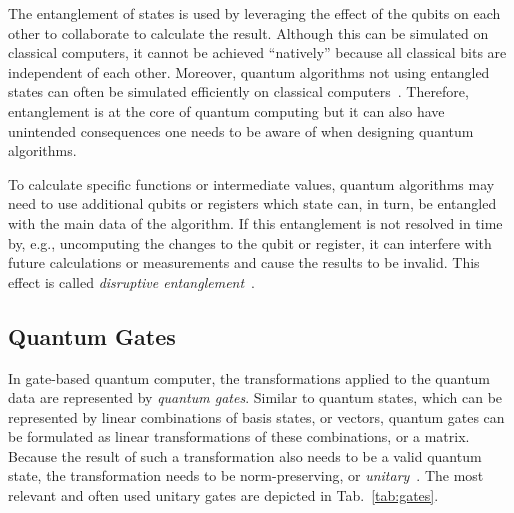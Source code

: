 The entanglement of states is used by leveraging the effect of the qubits on each other to collaborate to calculate the result. Although this can be simulated on classical computers, it cannot be achieved ``natively'' because all classical bits are independent of each other. Moreover, quantum algorithms not using entangled states can often be simulated efficiently on classical computers~\cite{MHH19}. Therefore, entanglement is at the core of quantum computing but it can also have unintended consequences one needs to be aware of when designing quantum algorithms.

To calculate specific functions or intermediate values, quantum algorithms may need to use additional qubits or registers which state can, in turn, be entangled with the main data of the algorithm. If this entanglement is not resolved in time by, e.g., uncomputing the changes to the qubit or register, it can interfere with future calculations or measurements and cause the results to be invalid. This effect is called \emph{disruptive entanglement}~\cite{YVC24}.  

\subsection{Quantum Gates}
\label{sec:background_quantumGates}
In gate-based quantum computer, the transformations applied to the quantum data are represented by \emph{quantum gates}. Similar to quantum states, which can be represented by linear combinations of basis states, or vectors, quantum gates can be formulated as linear transformations of these combinations, or a matrix. Because the result of such a transformation also needs to be a valid quantum state, the transformation needs to be norm-preserving, or \emph{unitary}~\cite{DiCh20}. The most relevant and often used unitary gates are depicted in Tab.~\ref{tab:gates}.

